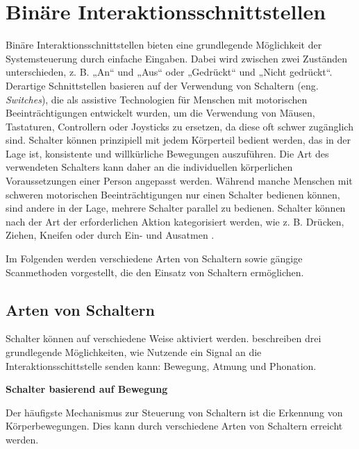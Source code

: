 \section{Binäre Interaktionsschnittstellen}

Binäre Interaktionsschnittstellen bieten eine grundlegende Möglichkeit der Systemsteuerung durch einfache Eingaben. Dabei wird zwischen zwei Zuständen unterschieden, z. B.  „An“ und „Aus“ oder „Gedrückt“ und „Nicht gedrückt“. Derartige Schnittstellen basieren auf der Verwendung von Schaltern (eng. \textit{Switches}), die als assistive Technologien für Menschen mit motorischen Beeinträchtigungen entwickelt wurden, um die Verwendung von Mäusen, Tastaturen, Controllern oder Joysticks zu ersetzen, da diese oft schwer zugänglich sind. Schalter können prinzipiell mit jedem Körperteil bedient werden, das in der Lage ist, konsistente und willkürliche Bewegungen auszuführen. Die Art des verwendeten Schalters kann daher an die individuellen körperlichen Voraussetzungen einer Person angepasst werden. Während manche Menschen mit schweren motorischen Beeinträchtigungen nur einen Schalter bedienen können, sind andere in der Lage, mehrere Schalter parallel zu bedienen. Schalter können nach der Art der erforderlichen Aktion kategorisiert werden, wie z. B.  Drücken, Ziehen, Kneifen oder durch Ein- und Ausatmen \citep{yuan_game_2011, Weber22111996}. 

Im Folgenden werden verschiedene Arten von Schaltern sowie gängige Scanmethoden vorgestellt, die den Einsatz von Schaltern ermöglichen.

\subsection{Arten von Schaltern}

Schalter können auf verschiedene Weise aktiviert werden. \citet{cook_chapter_2015} beschreiben drei grundlegende Möglichkeiten, wie Nutzende ein Signal an die Interaktionsschittstelle senden kann: Bewegung, Atmung und Phonation.

\textbf{Schalter basierend auf Bewegung}

Der häufigste Mechanismus zur Steuerung von Schaltern ist die Erkennung von Körperbewegungen. Dies kann durch verschiedene Arten von Schaltern erreicht werden.

